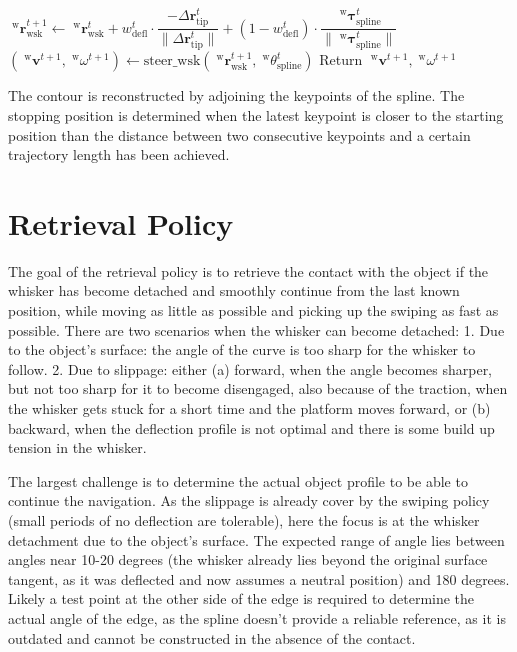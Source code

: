 \begin{algorithm}[htb]
\begin{algorithmic}
        \State \(\;^{\mathrm{w}}\boldsymbol{r}_{\mathrm{wsk}}^{t+1} \gets \;^{\mathrm{w}}\boldsymbol{r}_{\mathrm{wsk}}^{t} + w_{\mathrm{defl}}^{t} \cdot \dfrac{-\Delta\boldsymbol{r}_{\mathrm{tip}}^{t}}{\|\Delta\boldsymbol{r}_{\mathrm{tip}}^{t}\|} + (1 - w_{\mathrm{defl}}^{t}) \cdot \dfrac{\;^{\mathrm{w}}\boldsymbol{\tau}_{\mathrm{spline}}^{t}}{\|\;^{\mathrm{w}}\boldsymbol{\tau}_{\mathrm{spline}}^{t}\|}\) 
        \State
        \State
        \State \((\;^{\mathrm{w}}\boldsymbol{v}^{t+1}, \;^{\mathrm{w}}\omega^{t+1}) \gets \mathrm{steer\_wsk}(\;^{\mathrm{w}}\boldsymbol{r}_{\mathrm{wsk}}^{t+1},\;^{\mathrm{w}}\theta_{\mathrm{spline}}^{t})\)
        \State Return \(\;^{\mathrm{w}}\boldsymbol{v}^{t+1}, \;^{\mathrm{w}}\omega^{t+1}\)
    \end{algorithmic}
    \label{alg:swiping_policy}
\end{algorithm}

The contour is reconstructed by adjoining the keypoints of the spline.
The stopping position is determined when the latest keypoint is closer to the starting position than the distance between two consecutive keypoints and a certain trajectory length has been achieved.

\section{Retrieval Policy}

The goal of the retrieval policy is to retrieve the contact with the object if the whisker has become detached and smoothly continue from the last known position, while moving as little as possible and picking up the swiping as fast as possible.
There are two scenarios when the whisker can become detached:
1. Due to the object's surface: the angle of the curve is too sharp for the whisker to follow.
2. Due to slippage:
either (a) forward, when the angle becomes sharper, but not too sharp for it to become disengaged, also because of the traction, when the whisker gets stuck for a short time and the platform moves forward,
or (b) backward, when the deflection profile is not optimal and there is some build up tension in the whisker.

The largest challenge is to determine the actual object profile to be able to continue the navigation.
As the slippage is already cover by the swiping policy (small periods of no deflection are tolerable), here the focus is at the whisker detachment due to the object's surface.
The expected range of angle lies between angles near 10-20 degrees (the whisker already lies beyond the original surface tangent, as it was deflected and now assumes a neutral position) and 180 degrees.
Likely a test point at the other side of the edge is required to determine the actual angle of the edge, as the spline doesn't provide a reliable reference, as it is outdated and cannot be constructed in the absence of the contact.

